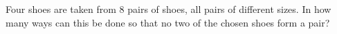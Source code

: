 Four shoes are taken from $8$ pairs of shoes, all pairs of different sizes. In how many ways can this be done so that no two of the chosen shoes form a pair?
